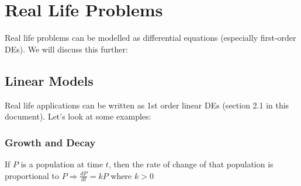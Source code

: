 \documentclass{article}
\begin{document}
\newpage\section{Real Life Problems}
Real life problems can be modelled as differential equations (especially first-order DEs). We will discuss this further:

\subsection{Linear Models} Real life applications can be written as 1st order linear DEs (section 2.1 in this document).
Let's look at some examples:

\subsubsection{Growth and Decay}
If $P$ is a population at time $t$, then the rate of change of that population is proportional to $P\Rightarrow\frac{dP}{dt}=kP$ where $k>0$
\end{document}
